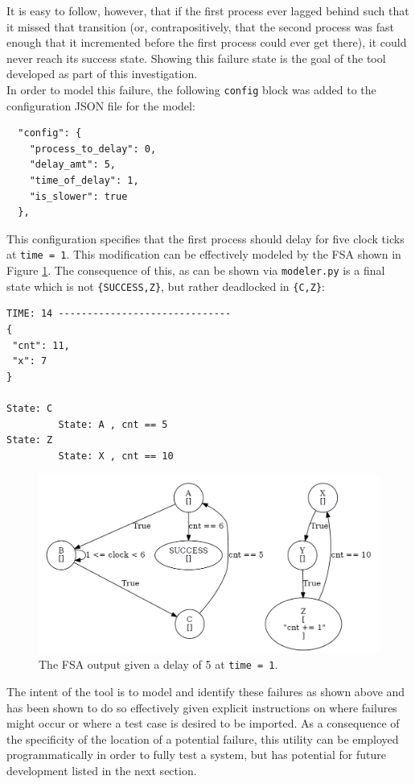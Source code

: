 \documentclass[12pt]{extarticle}
\begin{document}
It is easy to follow, however, that if the first process ever lagged behind such that it missed that transition (or, contrapositively, that the second process was fast enough that it incremented before the first process could ever get there), it could never reach its success state. Showing this failure state is the goal of the tool developed as part of this investigation.\\

In order to model this failure, the following \texttt{config} block was added to the configuration JSON file for the model:
\begin{verbatim}
  "config": {
    "process_to_delay": 0,
    "delay_amt": 5,
    "time_of_delay": 1,
    "is_slower": true
  },
\end{verbatim}
This configuration specifies that the first process should delay for five clock ticks at \verb|time = 1|. This modification can be effectively modeled by the FSA shown in Figure \ref{fig:finalviz}. The consequence of this, as can be shown via \texttt{modeler.py} is a final state which is not \verb|{SUCCESS,Z}|, but rather deadlocked in \verb|{C,Z}|:
\newpage
\begin{verbatim}
TIME: 14 ------------------------------
{
 "cnt": 11,
 "x": 7
}

State: C
         State: A , cnt == 5
State: Z
         State: X , cnt == 10
\end{verbatim}

\begin{figure}[!htbp]
  \begin{center}
  \includegraphics[width=400pt]{./final.png}
  \end{center}
  \caption{The FSA output given a delay of 5 at \texttt{time = 1}.}
  \label{fig:finalviz}
\end{figure}

The intent of the tool is to model and identify these failures as shown above and has been shown to do so effectively given explicit instructions on where failures might occur or where a test case is desired to be imported. As a consequence of the specificity of the location of a potential failure, this utility can be employed programmatically in order to fully test a system, but has potential for future development listed in the next section.
\end{document}
